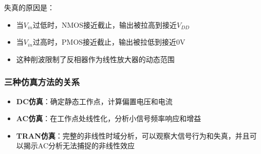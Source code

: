\documentclass[UTF8,12pt,a4paper]{ctexart}
\begin{document}
失真的原因是：
\begin{itemize}
\item 当$V_{in}$过低时，NMOS接近截止，输出被拉高到接近$V_{DD}$
\item 当$V_{in}$过高时，PMOS接近截止，输出被拉低到接近0V
\item 这种削波限制了反相器作为线性放大器的动态范围
\end{itemize}

\subsubsection{三种仿真方法的关系}
\begin{itemize}
\item \textbf{DC仿真}：确定静态工作点，计算偏置电压和电流
\item \textbf{AC仿真}：在工作点处线性化，分析小信号频率响应和增益
\item \textbf{TRAN仿真}：完整的非线性时域分析，可以观察大信号行为和失真，并且可以揭示AC分析无法捕捉的非线性效应
\end{itemize}
\end{document}
